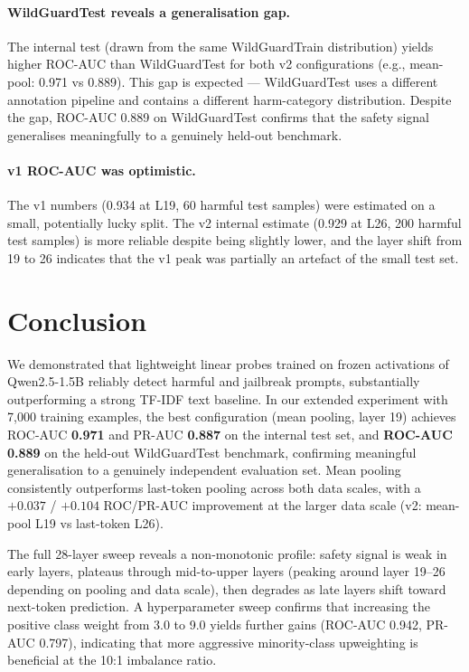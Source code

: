 \documentclass[11pt,a4paper]{article}
\begin{document}
\paragraph{WildGuardTest reveals a generalisation gap.}
The internal test (drawn from the same WildGuardTrain distribution) yields higher
ROC-AUC than WildGuardTest for both v2 configurations (e.g., mean-pool: 0.971 vs
0.889). This gap is expected --- WildGuardTest uses a different annotation pipeline
and contains a different harm-category distribution. Despite the gap, ROC-AUC 0.889
on WildGuardTest confirms that the safety signal generalises meaningfully to a
genuinely held-out benchmark.

\paragraph{v1 ROC-AUC was optimistic.}
The v1 numbers (0.934 at L19, 60 harmful test samples) were estimated on a small,
potentially lucky split. The v2 internal estimate (0.929 at L26, 200 harmful test
samples) is more reliable despite being slightly lower, and the layer shift from
19 to 26 indicates that the v1 peak was partially an artefact of the small test set.

\section{Conclusion}

We demonstrated that lightweight linear probes trained on frozen activations of
Qwen2.5-1.5B reliably detect harmful and jailbreak prompts, substantially
outperforming a strong TF-IDF text baseline. In our extended experiment with 7{,}000
training examples, the best configuration (mean pooling, layer 19) achieves
ROC-AUC \textbf{0.971} and PR-AUC \textbf{0.887} on the internal test set, and
\textbf{ROC-AUC 0.889} on the held-out WildGuardTest benchmark, confirming meaningful
generalisation to a genuinely independent evaluation set. Mean pooling consistently
outperforms last-token pooling across both data scales, with a $+0.037$ / $+0.104$
ROC/PR-AUC improvement at the larger data scale (v2: mean-pool L19 vs last-token L26).

The full 28-layer sweep reveals a non-monotonic profile: safety signal is weak in early
layers, plateaus through mid-to-upper layers (peaking around layer 19--26 depending on
pooling and data scale), then degrades as late layers shift toward next-token prediction.
A hyperparameter sweep confirms that increasing the positive class weight from 3.0 to 9.0
yields further gains (ROC-AUC 0.942, PR-AUC 0.797), indicating that more aggressive
minority-class upweighting is beneficial at the 10:1 imbalance ratio.
\end{document}

